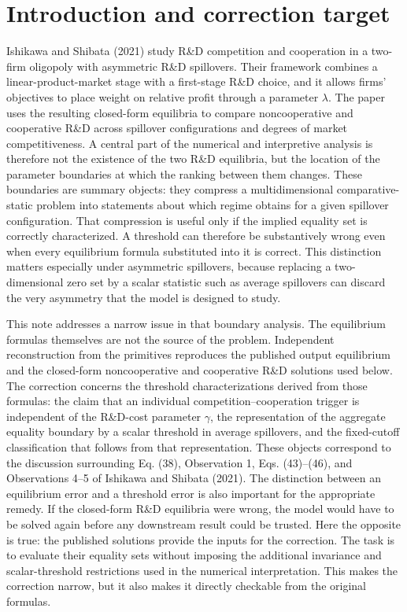 \section{Introduction and correction target}

Ishikawa and Shibata (2021) study R\&D competition and cooperation in a two-firm oligopoly with asymmetric R\&D spillovers. Their framework combines a linear-product-market stage with a first-stage R\&D choice, and it allows firms' objectives to place weight on relative profit through a parameter $\lambda$. The paper uses the resulting closed-form equilibria to compare noncooperative and cooperative R\&D across spillover configurations and degrees of market competitiveness. A central part of the numerical and interpretive analysis is therefore not the existence of the two R\&D equilibria, but the location of the parameter boundaries at which the ranking between them changes. These boundaries are summary objects: they compress a multidimensional comparative-static problem into statements about which regime obtains for a given spillover configuration. That compression is useful only if the implied equality set is correctly characterized. A threshold can therefore be substantively wrong even when every equilibrium formula substituted into it is correct. This distinction matters especially under asymmetric spillovers, because replacing a two-dimensional zero set by a scalar statistic such as average spillovers can discard the very asymmetry that the model is designed to study.

This note addresses a narrow issue in that boundary analysis. The equilibrium formulas themselves are not the source of the problem. Independent reconstruction from the primitives reproduces the published output equilibrium and the closed-form noncooperative and cooperative R\&D solutions used below. The correction concerns the threshold characterizations derived from those formulas: the claim that an individual competition--cooperation trigger is independent of the R\&D-cost parameter $\gamma$, the representation of the aggregate equality boundary by a scalar threshold in average spillovers, and the fixed-cutoff classification that follows from that representation. These objects correspond to the discussion surrounding Eq. (38), Observation 1, Eqs. (43)--(46), and Observations 4--5 of Ishikawa and Shibata (2021). The distinction between an equilibrium error and a threshold error is also important for the appropriate remedy. If the closed-form R\&D equilibria were wrong, the model would have to be solved again before any downstream result could be trusted. Here the opposite is true: the published solutions provide the inputs for the correction. The task is to evaluate their equality sets without imposing the additional invariance and scalar-threshold restrictions used in the numerical interpretation. This makes the correction narrow, but it also makes it directly checkable from the original formulas.

